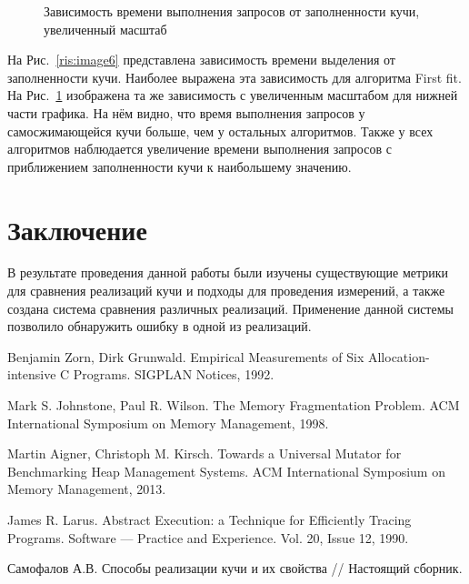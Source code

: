    \begin{figure}[p]
   \caption{Зависимость времени выполнения запросов от заполненности кучи, увеличенный масштаб}
   \label{ris:image7}
   \end{figure}
   
   На Рис.~\ref{ris:image6} представлена зависимость времени выделения от заполненности кучи. Наиболее выражена эта зависимость для 
алгоритма First fit. На Рис.~\ref{ris:image7} изображена та же зависимость с увеличенным масштабом для нижней части графика. 
На нём видно, что время выполнения запросов у самосжимающейся кучи больше, чем у остальных алгоритмов. Также у всех алгоритмов наблюдается 
увеличение времени выполнения запросов с приближением заполненности кучи к наибольшему значению.
   
\section*{Заключение}
   
В результате проведения данной работы были изучены существующие метрики для сравнения реализаций кучи и подходы для проведения измерений,
а также создана система сравнения различных реализаций. Применение данной системы позволило обнаружить ошибку в одной из
реализаций.

\begin{thebibliography}{99}
Benjamin Zorn, Dirk Grunwald.
Empirical Measurements of Six Allocation-intensive C Programs. SIGPLAN Notices, 1992.

Mark S. Johnstone, Paul R. Wilson.
The Memory Fragmentation Problem. ACM International Symposium on Memory Management, 1998.

Martin Aigner, Christoph M. Kirsch. Towards a Universal Mutator for Benchmarking Heap Management Systems.
ACM International Symposium on Memory Management, 2013.

James R. Larus. Abstract Execution: a Technique for Efficiently Tracing Programs.
Software --- Practice and Experience. Vol. 20, Issue 12, 1990.

Самофалов А.В. Способы реализации кучи и их свойства // Настоящий сборник.
\end{thebibliography}
